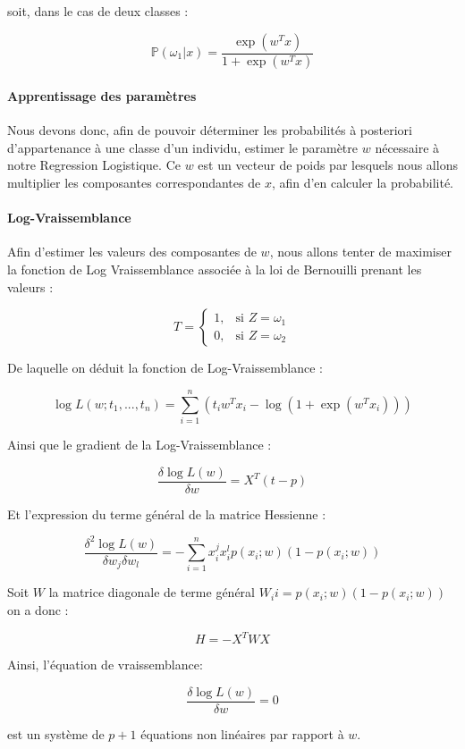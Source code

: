 \documentclass{report}
\begin{document}
\newpage
soit, dans le cas de deux classes :


$$\mathbb{P}(\omega_1|x) = \frac{\exp(w^T x)}{1 + \exp (w^T x)}$$


\paragraph{Apprentissage des paramètres}
Nous devons donc, afin de pouvoir déterminer les probabilités à posteriori d'appartenance à une classe d'un individu, estimer le paramètre $w$ nécessaire à notre Regression Logistique. Ce $w$ est un vecteur de poids par lesquels nous allons multiplier les composantes correspondantes de $x$, afin d'en calculer la probabilité.

\paragraph{Log-Vraissemblance}
Afin d'estimer les valeurs des composantes de $w$, nous allons tenter de maximiser la fonction de Log Vraissemblance associée à la loi de Bernouilli prenant les valeurs :

$$T =
    \begin{cases}
        1, & \text{si } Z = \omega_1 \\
        0, & \text{si } Z = \omega_2
    \end{cases}
$$


De laquelle on déduit la fonction de Log-Vraissemblance :

$$ \log L(w; t_1,...,t_n) = \sum_{i=1}^{n} (t_i w^T x_i - \log (1 + \exp (w^T x_i)))$$

Ainsi que le gradient de la Log-Vraissemblance :


$$\frac{\delta \log L (w)}{\delta w} = X^T (t - p) $$


Et l'expression du terme général de la matrice Hessienne :


$$ \frac{\delta^2 \log L(w)}{\delta w_j \delta w_l} = - \sum_{i=1}^{n}x_i^j x_i^l p(x_i;w)(1-p(x_i;w))$$


Soit $W$ la matrice diagonale de terme général $W_ii = p(x_i;w)(1-p(x_i;w))$ on a donc :


$$ H = -X^T W X $$


Ainsi, l'équation de vraissemblance:


$$ \frac{\delta \log L(w)}{\delta w} = 0$$


est un système de $p+1$ équations non linéaires par rapport à $w$.
\end{document}
